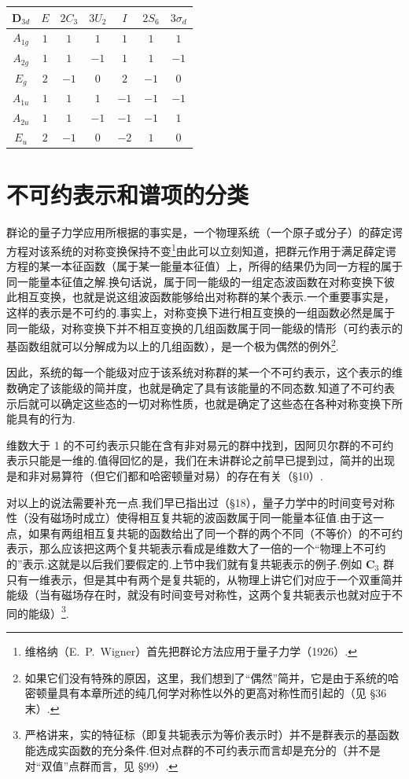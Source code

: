 \begin{center}
\renewcommand{\arraystretch}{1.3}%
\begin{tabular}{c|cccccc}
  $\boldsymbol{D}_{3d}$ & $E$ & $2C_3$ & $3U_2$ & $I$ & $2S_6$ & $3\sigma_d$\\
  \hline
  $A_{1g}$ & $1$ & $1$ & $1$ & $1$ & $1$ & $1$\\
  $A_{2g}$ & $1$ & $1$ & $-1$ & $1$ & $1$ & $-1$\\
  $E_g$ & $2$ & $-1$ & $0$ & $2$ & $-1$ & $0$\\
  $A_{1u}$ & $1$ & $1$ & $1$ & $-1$ & $-1$ & $-1$\\
  $A_{2u}$ & $1$ & $1$ & $-1$ & $-1$ & $-1$ & $1$\\
  $E_u$ & $2$ & $-1$ & $0$ & $-2$ & $1$ & $0$\\
\end{tabular}
\end{center}

\section{不可约表示和谱项的分类}

群论的量子力学应用所根据的事实是，一个物理系统（一个原子或分子）的薛定谔方程对该系统的对称变换保持不变\footnote{维格纳（E.~P.~Wigner）首先把群论方法应用于量子力学（1926）.}由此可以立刻知道，把群元作用于满足薛定谔方程的某一本征函数（属于某一能量本征值）上，所得的结果仍为同一方程的属于同一能量本征值之解.换句话说，属于同一能级的一组定态波函数在对称变换下彼此相互变换，也就是说这组波函数能够给出对称群的某个表示.一个重要事实是，这样的表示是不可约的.事实上，对称变换下进行相互变换的一组函数必然是属于同一能级，对称变换下并不相互变换的几组函数属于同一能级的情形（可约表示的基函数组就可以分解成为以上的几组函数），是一个极为偶然的例外\footnote{如果它们没有特殊的原因，这里，我们想到了“偶然”简并，它是由于系统的哈密顿量具有本章所述的纯几何学对称性以外的更高对称性而引起的（见 §36 末）.}.

因此，系统的每一个能级对应于该系统对称群的某一个不可约表示，这个表示的维数确定了该能级的简并度，也就是确定了具有该能量的不同态数.知道了不可约表示后就可以确定这些态的一切对称性质，也就是确定了这些态在各种对称变换下所能具有的行为.

维数大于 1 的不可约表示只能在含有非对易元的群中找到，因阿贝尔群的不可约表示只能是一维的.值得回忆的是，我们在未讲群论之前早已提到过，简并的出现是和非对易算符（但它们都和哈密顿量对易）的存在有关（§10）.

对以上的说法需要补充一点.我们早已指出过（§18），量子力学中的时间变号对称性（没有磁场时成立）使得相互复共轭的波函数属于同一能量本征值.由于这一点，如果有两组相互复共轭的函数给出了同一个群的两个不同（不等价）的不可约表示，那么应该把这两个复共轭表示看成是维数大了一倍的一个“物理上不可约的”表示.这就是以后我们要假定的.上节中我们就有复共轭表示的例子.例如 $\boldsymbol{C}_3$ 群只有一维表示，但是其中有两个是复共轭的，从物理上讲它们对应于一个双重简并能级（当有磁场存在时，就没有时间变号对称性，这两个复共轭表示也就对应于不同的能级）\footnote{严格讲来，实的特征标（即复共轭表示为等价表示时）并不是群表示的基函数能选成实函数的充分条件.但对点群的不可约表示而言却是充分的（并不是对“双值”点群而言，见 §99）.}.


